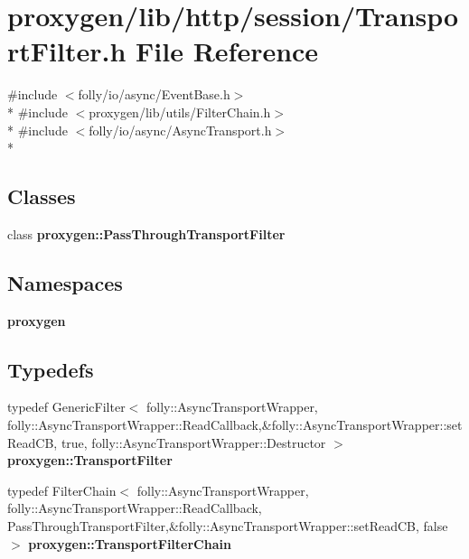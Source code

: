 \section{proxygen/lib/http/session/\+Transport\+Filter.h File Reference}
\label{TransportFilter_8h}
{\ttfamily \#include $<$folly/io/async/\+Event\+Base.\+h$>$}\\*
{\ttfamily \#include $<$proxygen/lib/utils/\+Filter\+Chain.\+h$>$}\\*
{\ttfamily \#include $<$folly/io/async/\+Async\+Transport.\+h$>$}\\*
\subsection*{Classes}
\begin{DoxyCompactItemize}
\item 
class {\bf proxygen\+::\+Pass\+Through\+Transport\+Filter}
\end{DoxyCompactItemize}
\subsection*{Namespaces}
\begin{DoxyCompactItemize}
\item 
 {\bf proxygen}
\end{DoxyCompactItemize}
\subsection*{Typedefs}
\begin{DoxyCompactItemize}
\item 
typedef Generic\+Filter$<$ folly\+::\+Async\+Transport\+Wrapper, folly\+::\+Async\+Transport\+Wrapper\+::\+Read\+Callback,\&folly\+::\+Async\+Transport\+Wrapper\+::set\+Read\+CB, true, folly\+::\+Async\+Transport\+Wrapper\+::\+Destructor $>$ {\bf proxygen\+::\+Transport\+Filter}
\item 
typedef Filter\+Chain$<$ folly\+::\+Async\+Transport\+Wrapper, folly\+::\+Async\+Transport\+Wrapper\+::\+Read\+Callback, Pass\+Through\+Transport\+Filter,\&folly\+::\+Async\+Transport\+Wrapper\+::set\+Read\+CB, false $>$ {\bf proxygen\+::\+Transport\+Filter\+Chain}
\end{DoxyCompactItemize}
